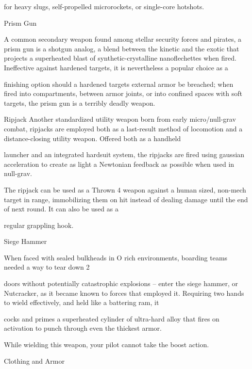 for heavy slugs, self-propelled microrockets, or single-core hotshots.  

Prism Gun  

A common secondary weapon found among stellar security forces and pirates, a prism gun is a shotgun  
analog, a blend between the kinetic and the exotic that projects a superheated blast of synthetic-crystalline  
nanoflechettes when fired. Ineffective against hardened targets, it is nevertheless a popular choice as a  

finishing option should a hardened targets external armor be breached; when fired into compartments,  
between armor joints, or into confined spaces with soft targets, the prism gun is a terribly deadly weapon.   

Ripjack  
Another standardized utility weapon born from early micro/null-grav combat, ripjacks are employed both as  
a last-result method of locomotion and a distance-closing utility weapon. Offered both as a handheld  

launcher and an integrated hardsuit system, the ripjacks are fired using gaussian acceleration to create as  
light a Newtonian feedback as possible when used in null-grav.     

                                                                                                                       


The ripjack can be used as a Thrown 4 weapon against a human sized, non-mech target in range,  
immobilizing them on hit instead of dealing damage until the end of next round. It can also be used as a  

regular grappling hook.
 

Siege Hammer  

When faced with sealed bulkheads in O   rich environments, boarding teams needed a way to tear down  
                                             2  

doors without potentially catastrophic explosions -- enter the siege hammer, or Nutcracker, as it became  
known to forces that employed it. Requiring two hands to wield effectively, and held like a battering ram, it  

cocks and primes a superheated cylinder of ultra-hard alloy that fires on activation to punch through even  
the thickest armor.  

While wielding this weapon, your pilot cannot take the boost action.
 

                                                 Clothing and Armor  

